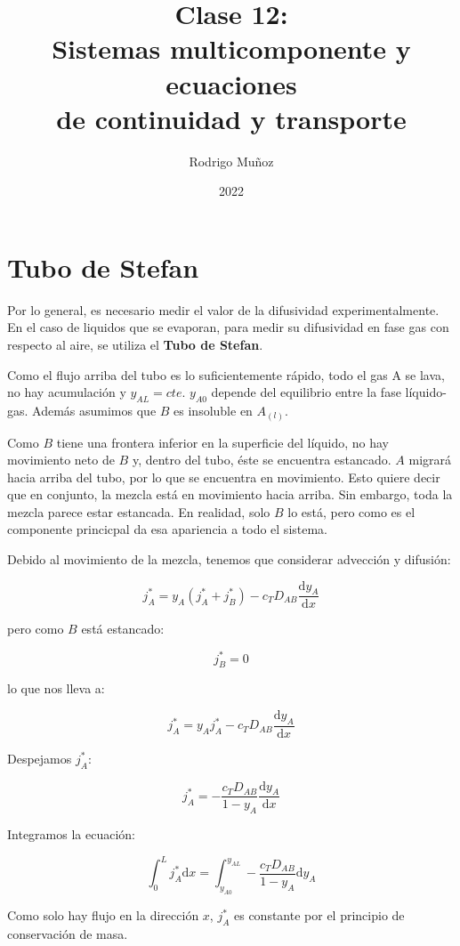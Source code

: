 \documentclass[11pt]{article}
\title{Clase 12: \\ Sistemas multicomponente y ecuaciones \\ de continuidad y transporte}
\author{Rodrigo Muñoz}
\date{2022}
\begin{document}
\maketitle

\section{Tubo de Stefan}

Por lo general, es necesario medir el valor de la difusividad experimentalmente. En el caso de liquidos que se evaporan, para medir su difusividad en fase gas con respecto al aire, se utiliza el \textbf{Tubo de Stefan}.

Como el flujo arriba del tubo es lo suficientemente rápido, todo el gas A se lava, no hay acumulación y \( y_{AL} = cte \). \( y_{A0} \) depende del equilibrio entre la fase líquido-gas. Además asumimos que \( B \) es insoluble en \( A_{ \left( l \right) } \).

Como \( B \) tiene una frontera inferior en la superficie del líquido, no hay movimiento neto de \( B \) y, dentro del tubo, éste se encuentra estancado. \( A \) migrará hacia arriba del tubo, por lo que se encuentra en movimiento. Esto quiere decir que en conjunto, la mezcla está en movimiento hacia arriba. Sin embargo, toda la mezcla parece estar estancada. En realidad, solo \( B \) lo está, pero como es el componente princicpal da esa apariencia a todo el sistema.

Debido al movimiento de la mezcla, tenemos que considerar advección y difusión:

\[ j_A^* = y_A \left( j_A^* + j_B^* \right) - c_T D_{AB} \frac{ \mathrm d y_A }{ \mathrm d x } \]

pero como \( B \) está estancado:

\[ j_B^* = 0 \]

lo que nos lleva a:

\[ j_A^* = y_A j_A^* - c_T D_{AB} \frac{ \mathrm d y_A }{ \mathrm d x } \]

Despejamos \( j_A^* \):

\[ j_A^* = - \frac{ c_T D_{AB} }{ 1 - y_A } \frac{ \mathrm d y_A }{ \mathrm d x } \]

Integramos la ecuación:

\[ \int_0^L j_A^* \mathrm dx = \int_{y_{A0}}^{y_{AL}} - \frac{ c_T D_{AB} }{ 1 - y_A } \mathrm d y_A \]

Como solo hay flujo en la dirección \( x \), \( j_A^* \) es constante por el principio de conservación de masa.
\end{document}
